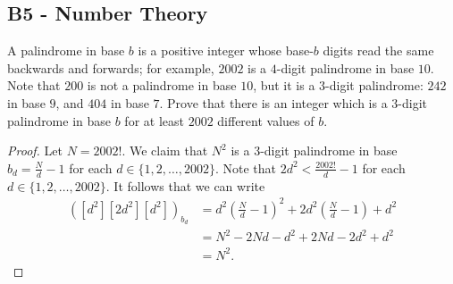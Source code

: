 \documentclass[11pt]{scrartcl}
\newcommand{\<}{\langle}
\renewcommand{\>}{\rangle}
\begin{document}
\subsection{B5 - Number Theory}
A palindrome in base $b$ is a positive integer whose base-$b$ digits read the same backwards and forwards; for example, $2002$ is a $4$-digit palindrome in base $10$. Note that $200$ is not a palindrome in base $10$, but it is a $3$-digit palindrome: $242$ in base $9$, and $404$ in base $7$. Prove that there is an integer which is a $3$-digit palindrome in base $b$ for at least $2002$ different values of $b$.
\begin{proof}
Let $N = 2002!$.  We claim that $N^2$ is a $3$-digit palindrome in base $b_d = \frac{N}{d} - 1$ for each $d \in \{1, 2, \dots, 2002\}$.  Note that $2d^2 < \frac{2002!}{d} - 1$ for each $d \in \{1, 2, \dots, 2002\}$.  It follows that we can write
\begin{align*}
([d^2][2d^2][d^2])_{b_d} &= d^2\left(\frac{N}{d} - 1 \right)^2 + 2d^2\left(\frac{N}{d} - 1 \right) + d^2 \\
&= N^2 - 2Nd - d^2 + 2Nd - 2d^2 + d^2 \\
&= N^2.
\end{align*}

\end{proof}
\end{document}
